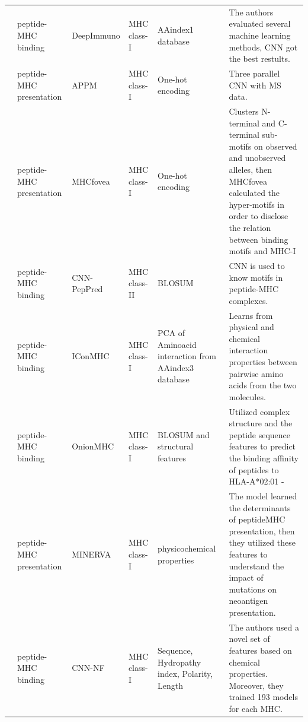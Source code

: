\begin{table}[]
{\begin{tabular}{p{1.3cm}p{1.6cm}p{2cm}p{1.6cm}p{1.9cm}p{4cm}}
			 \cite{li2021deepimmuno}   & peptide-MHC binding      & DeepImmuno    & MHC class-I        & AAindex1 database                                   & The authors evaluated several machine learning methods, CNN got the best restults.            \\
			           \cite{lang2021neofox}     & peptide-MHC presentation & APPM          & MHC class-I        & One-hot encoding                                    & Three parallel CNN with MS data.                                       \\
			           \cite{lee2021connecting}  & peptide-MHC presentation & MHCfovea      & MHC class-I        & One-hot encoding                                    & Clusters N-terminal and C-terminal sub-motifs on observed and unobserved alleles, then MHCfovea calculated the hyper-motifs in order to disclose the relation between binding motifs and MHC-I                                                                        \\
			           \cite{junet2021cnn}       & peptide-MHC binding      & CNN-PepPred   & MHC class-II       & BLOSUM                                              & CNN is used to know motifs in peptide-MHC complexes.     \\
			           \cite{pei2020iconmhc}     & peptide-MHC binding      & IConMHC       & MHC class-I        & PCA of Aminoacid interaction from AAindex3 database & Learns from physical and chemical interaction properties between pairwise amino acids from the two molecules.                \\
			          \cite{saxena2020onionmhc} & peptide-MHC binding      & OnionMHC      & MHC class-I        & BLOSUM and structural features                      & Utilized complex structure and the peptide sequence features to predict the binding affinity of peptides to HLA-A*02:01                   -                                                                              \\
			           \cite{ng3704016minerva}   & peptide-MHC presentation & MINERVA       & MHC class-I        & physicochemical properties                          & The model learned the determinants of peptideMHC presentation, then they utilized these features to understand the impact of mutations on neoantigen presentation.                                                               \\
			           \cite{zhao2019peptide}    & peptide-MHC binding      & CNN-NF        & MHC class-I        & Sequence, Hydropathy index, Polarity, Length        & The authors used a novel set of features based on chemical properties. Moreover, they trained 193 models for each MHC.                                    \\

\end{tabular}}
\end{table}
